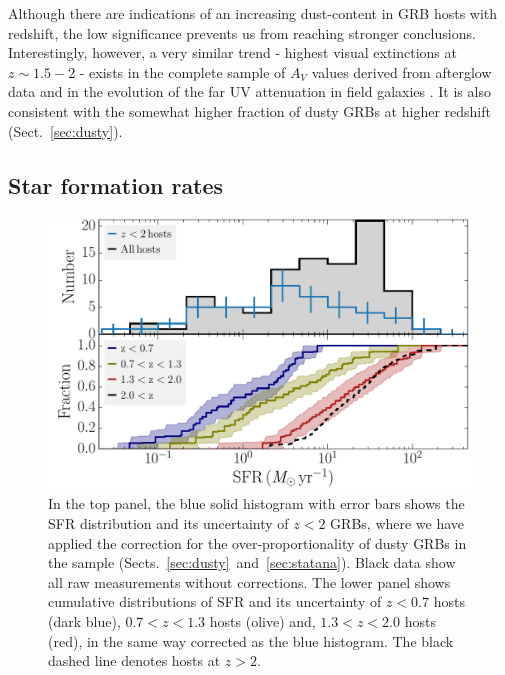 \documentclass[traditabstract, longauth]{aa}
\begin{document}
Although there are indications of an increasing dust-content in GRB hosts with redshift, the low significance prevents us from reaching stronger conclusions. Interestingly, however, a very similar trend - highest visual extinctions at $z\sim1.5-2$ - exists in the complete sample of $A_V$ values derived from afterglow data \citep{2013MNRAS.432.1231C} and in the evolution of the far UV attenuation in field galaxies \citep{2012A&A...539A..31C}. It is also consistent with the somewhat higher fraction of dusty GRBs at higher redshift (Sect.~\ref{sec:dusty}).

\subsection{Star formation rates}
\label{sec:sfr}

\begin{figure}
\includegraphics[angle=0, width=0.99\columnwidth]{Figs/SFR_histogram.pdf}
\caption{In the top panel, the blue solid histogram with error bars shows the SFR distribution and its uncertainty of $z < 2$ GRBs, where we have applied the correction for the over-proportionality of dusty GRBs in the sample (Sects.~\ref{sec:dusty}~and~\ref{sec:statana}). Black data show all raw measurements without corrections. The lower panel shows cumulative distributions of SFR and its uncertainty of $z<0.7$ hosts (dark blue), $0.7<z<1.3$ hosts (olive) and, $1.3<z<2.0$ hosts (red), in the same way corrected as the blue histogram. The black dashed line denotes hosts at $z > 2$.}
\label{fig:sfrhist}
\end{figure}
\end{document}
